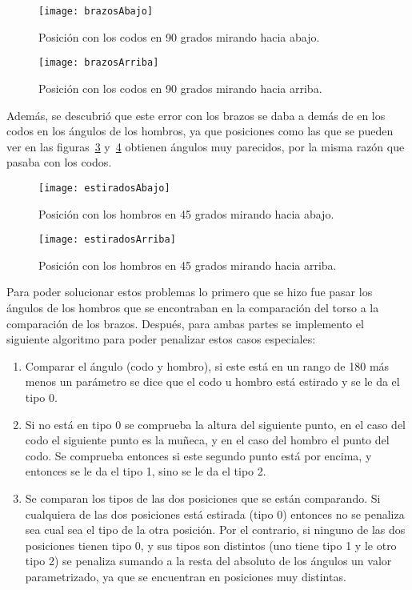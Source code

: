 \begin{figure}[h]
	\centering
	\texttt{[image: brazosAbajo]}
	\caption{Posición con los codos en 90 grados mirando hacia abajo.}
	\label{fig:brazosAbajo}
\end{figure}

\begin{figure}[h]
	\centering
	\texttt{[image: brazosArriba]}
	\caption{Posición con los codos en 90 grados mirando hacia arriba.}
	\label{fig:brazosArriba}
\end{figure}

Además, se descubrió que este error con los brazos se daba a demás de en los codos en los ángulos de los hombros, ya que posiciones como las que se pueden ver en las figuras~\ref{fig:estiradosAbajo} y~\ref{fig:estiradosArriba} obtienen ángulos muy parecidos, por la misma razón que pasaba con los codos.

\begin{figure}[h]
	\centering
	\texttt{[image: estiradosAbajo]}
	\caption{Posición con los hombros en 45 grados mirando hacia abajo.}
	\label{fig:estiradosAbajo}
\end{figure}

\begin{figure}[h]
	\centering
	\texttt{[image: estiradosArriba]}
	\caption{Posición con los hombros en 45 grados mirando hacia arriba.}
	\label{fig:estiradosArriba}
\end{figure}

Para poder solucionar estos problemas lo primero que se hizo fue pasar los ángulos de los hombros que se encontraban en la comparación del torso a la comparación de los brazos. Después, para ambas partes se implemento el siguiente algoritmo para poder penalizar estos casos especiales:
\begin{enumerate}
	\item Comparar el ángulo (codo y hombro), si este está en un rango de 180 más menos un parámetro se dice que el codo u hombro está estirado y se le da el tipo 0.
	\item Si no está en tipo 0 se comprueba la altura del siguiente punto, en el caso del codo el siguiente punto es la muñeca, y en el caso del hombro el punto del codo. Se comprueba entonces si este segundo punto está por encima, y entonces se le da el tipo 1, sino se le da el tipo 2.
	\item Se comparan los tipos de las dos posiciones que se están comparando. Si cualquiera de las dos posiciones está estirada (tipo 0) entonces no se penaliza sea cual sea el tipo de la otra posición. Por el contrario, si ninguno de las dos posiciones tienen tipo 0, y sus tipos son distintos (uno tiene tipo 1 y le otro tipo 2) se penaliza sumando a la resta del absoluto de los ángulos un valor parametrizado, ya que se encuentran en posiciones muy distintas.
\end{enumerate}

